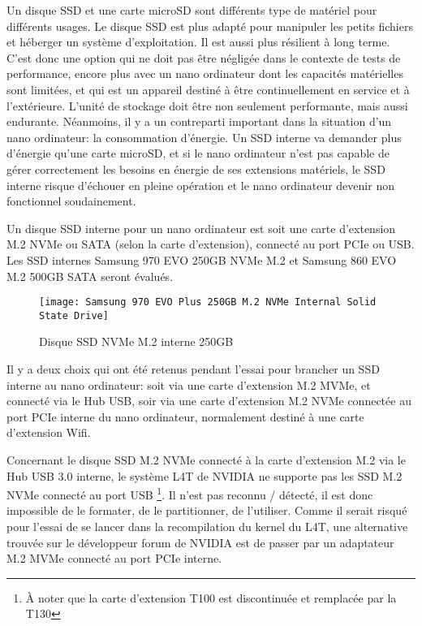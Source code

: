 \par Un disque SSD et une carte microSD sont différents type de matériel pour différents usages. Le disque SSD est plus adapté pour manipuler les petits fichiers et héberger un système d'exploitation. Il est aussi plus résilient à long terme. C'est donc une option qui ne doit pas être négligée dans le contexte de tests de performance, encore plus avec un nano ordinateur dont les capacités matérielles sont limitées, et qui est un appareil destiné à être continuellement en service et à l'extérieure. L'unité de stockage doit être non seulement performante, mais aussi endurante. Néanmoins, il y a un contreparti important dans la situation d'un nano ordinateur: la consommation d'énergie. Un SSD interne va demander plus d'énergie qu'une carte microSD, et si le nano ordinateur n'est pas capable de gérer correctement les besoins en énergie de ses extensions matériels, le SSD interne risque d'échouer en pleine opération et le nano ordinateur devenir non fonctionnel soudainement.
\par Un disque SSD interne pour un nano ordinateur est soit une carte d'extension M.2 NVMe ou SATA (selon la carte d'extension), connecté au port PCIe ou USB. Les SSD internes Samsung 970 EVO 250GB NVMe M.2 et Samsung 860 EVO M.2 500GB SATA seront évalués.
\begin{figure}[H]
    \centering
    \texttt{[image: Samsung 970 EVO Plus 250GB M.2 NVMe Internal Solid State Drive]}
    \caption{Disque SSD NVMe M.2 interne 250GB}
    \label{fig:disquessd}
\end{figure}
\par Il y a deux choix qui ont été retenus pendant l'essai pour brancher un SSD interne au nano ordinateur: soit via une carte d'extension M.2 MVMe, et connecté via le Hub USB, soir via une carte d'extension M.2 NVMe connectée au port PCIe interne du nano ordinateur, normalement destiné à une carte d'extension Wifi.
\par Concernant le disque SSD M.2 NVMe connecté à la carte d'extension M.2 via le Hub USB 3.0 interne, le système L4T de NVIDIA ne supporte pas les SSD M.2 NVMe connecté au port USB \footnote{À noter que la carte d'extension T100 est discontinuée et remplacée par la T130}. Il n'est pas reconnu / détecté, il est donc impossible de le formater, de le partitionner, de l'utiliser. Comme il serait risqué pour l'essai de se lancer dans la recompilation du kernel du L4T, une alternative trouvée sur le développeur forum de NVIDIA est de passer par un adaptateur M.2 MVMe connecté au port PCIe interne.
